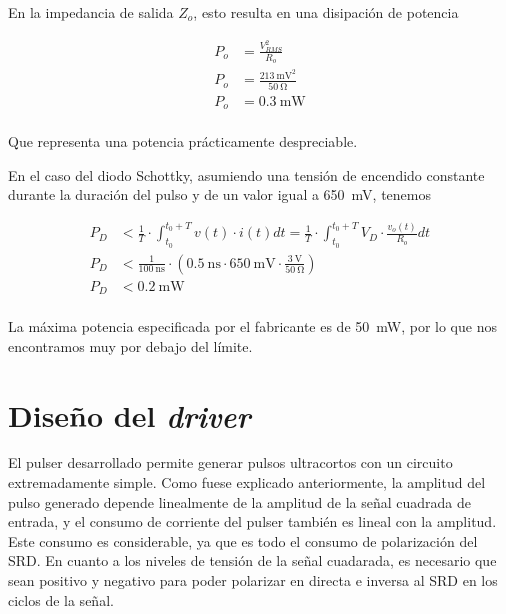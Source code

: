 En la impedancia de salida $Z_o$, esto resulta en una disipación de potencia

\begin{equation}
    \begin{aligned}
        P_{o} &= \frac{V_{RMS}^2}{R_o} \\
        P_{o} &= \frac{ \qty{213}{\milli\volt}^2}{ \qty{50}{\ohm}} \\
        P_{o} &= \qty{0.3}{\milli\watt} \\
    \end{aligned}
\end{equation}

Que representa una potencia prácticamente despreciable.

En el caso del diodo Schottky, asumiendo una tensión de encendido constante
durante la duración del pulso y de un valor igual a \qty{650}{\milli\volt},
tenemos

\begin{equation}
    \begin{aligned}
        P_{D} &< \frac{1}{T} \cdot \int_{t_0}^{t_0+T} v(t) \cdot i(t) dt =
        \frac{1}{T} \cdot \int_{t_0}^{t_0+T} V_D \cdot \frac{v_o(t)}{R_o} dt \\
        P_{D} &< \frac{1}{\qty{100}{\nano\second}} \cdot \left( \qty{0.5}{\nano\second} \cdot
        \qty{650}{\milli\volt} \cdot \frac{\qty{3}{\volt}}{
            \qty{50}{\ohm}} \right) \\
        P_{D} &< \qty{0.2}{\milli\watt} \\
    \end{aligned}
\end{equation}

La máxima potencia especificada por el fabricante es de \qty{50}{\milli\watt},
por lo que nos encontramos muy por debajo del límite.

\section{Diseño del \textit{driver}}

El pulser desarrollado permite generar pulsos ultracortos con un circuito
extremadamente simple. Como fuese explicado anteriormente, la amplitud del pulso
generado depende linealmente de la amplitud de la señal cuadrada de entrada, y
el consumo de corriente del pulser también es lineal con la amplitud. Este
consumo es considerable, ya que es todo el consumo de polarización del SRD. En
cuanto a los niveles de tensión de la señal cuadarada, es necesario que sean
positivo y negativo para poder polarizar en directa e inversa al SRD en los
ciclos de la señal.


